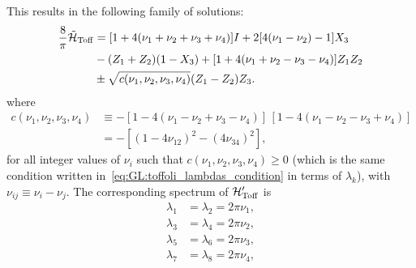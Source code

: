 This results in the following family of solutions:
\begin{equation}
\begin{aligned}
	\frac{8}{\pi}\tilde{{\mathcal{H}}}_{\operatorname{Toff}} &=
	[1 + 4(\nu_1+\nu_2+\nu_3+\nu_4)] I +
	2[4(\nu_1-\nu_2) - 1] X_3 \\
	&- (Z_1 + Z_2)(1 - X_3) +
	[1 + 4(\nu_1+\nu_2-\nu_3-\nu_4)] Z_1 Z_2 \\
	&\pm \sqrt{c(\nu_1,\nu_2,\nu_3,\nu_4)} (Z_1 - Z_2)Z_3.
\end{aligned}
\label{eq:GL:toff_tilde_general_solution}
\end{equation}
where
\begin{equation}
\begin{split}
	c(\nu_1, \nu_2, \nu_3, \nu_4) &\equiv
		-[1 - 4(\nu_1 - \nu_2 + \nu_3 - \nu_4)]
		\, [1 - 4(\nu_1 - \nu_2 - \nu_3 + \nu_4)]\\
		&= -[(1-4\nu_{12})^2-(4\nu_{34})^2],
\end{split}
\end{equation}
for all integer values of $\nu_i$ such that $c(\nu_1, \nu_2, \nu_3, \nu_4) \ge 0$ (which is the same condition written in~\cref{eq:GL:toffoli_lambdas_condition} in terms of $\lambda_k$), with $\nu_{ij}\equiv\nu_i-\nu_j$.
The corresponding spectrum of ${\mathcal{H}}'_{\operatorname{Toff}}$ is
\begin{equation}
\begin{aligned}
	\lambda_1 &= \lambda_2 = 2\pi \nu_1, \\
	\lambda_3 &= \lambda_4 = 2\pi \nu_2, \\
	\lambda_5 &= \lambda_6 = 2\pi \nu_3, \\
	\lambda_7 &= \lambda_8 = 2\pi \nu_4, 
\end{aligned}
\end{equation}
